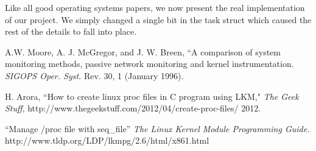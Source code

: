 \documentclass[conference]{IEEEtran}
\begin{document}
Like all good operating systems papers, we now present the real implementation of our project.
We simply changed a single bit in the task struct which caused the rest of the details to fall into place.



%
%
%


\def\V{\rm vol.~}
\def\N{no.~}
\def\pp{pp.~}
\def\Pot{\it Proc. }
\def\IJCNN{\it International Joint Conference on Neural Networks\rm }
\def\ACC{\it American Control Conference\rm }
\def\SMC{\it IEEE Trans. Systems\rm , \it Man\rm , and \it Cybernetics\rm }

\def\handb{ \it Handbook of Intelligent Control: Neural\rm , \it
    Fuzzy\rm , \it and Adaptive Approaches \rm }

\begin{thebibliography}{1}
 A.W. Moore, A. J. McGregor, and J. W. Breen,
        ``A comparison of system monitoring methods, passive network monitoring and kernel instrumentation.
        {\it SIGOPS Oper. Syst.} Rev. 30, 1 (January 1996).

 H. Arora, ``How to create linux proc files in C program using LKM,"
        {\it The Geek Stuff}, http://www.thegeekstuff.com/2012/04/create-proc-files/ 2012.

 ``Manage /proc file with seq\_file''
	{\it The Linux Kernel Module Programming Guide.}
        http://www.tldp.org/LDP/lkmpg/2.6/html/x861.html

\end{thebibliography}

\end{document}
